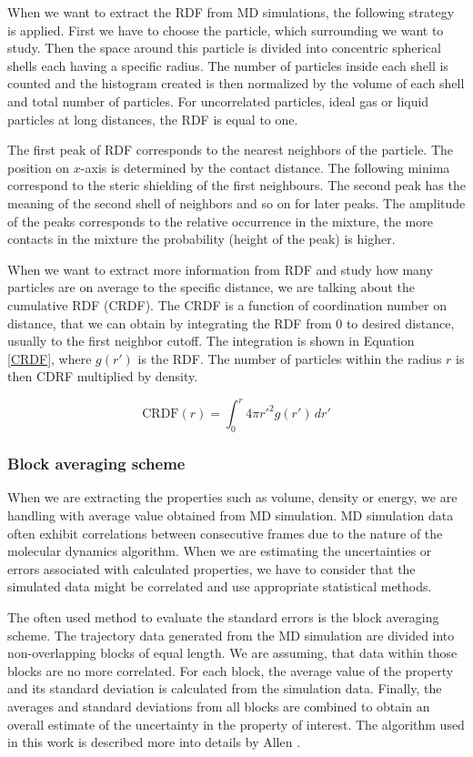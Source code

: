 When we want to extract the RDF from MD simulations, the following strategy is applied. First we have to choose the particle, which surrounding we want to study. Then the space around this particle is divided into concentric spherical shells each having a specific radius. The number of particles inside each shell is counted and the histogram created is then normalized by the volume of each shell and total number of particles. For uncorrelated particles, ideal gas or liquid particles at long distances, the RDF is equal to one. 

The first peak of RDF corresponds to the nearest neighbors of the particle. The position on $x$-axis is determined by the contact distance. The following minima correspond to the steric shielding of the first neighbours. The second peak has the meaning of the second shell of neighbors and so on for later peaks. The amplitude of the peaks corresponds to the relative occurrence in the mixture, the more contacts in the mixture the probability (height of the peak) is higher. \cite{mdskripta}

When we want to extract more information from RDF and study how many particles are on average to the specific distance, we are talking about the cumulative RDF (CRDF). The CRDF is a function of coordination number on distance, that we can obtain by integrating the RDF from 0 to desired distance, usually to the first neighbor cutoff. The integration is shown in Equation \ref{CRDF}, where $g(r')$ is the RDF. The number of particles within the radius $r$ is then CDRF multiplied by density. \cite{mdskripta}

\begin{equation}\label{eq:CRDF}
	\text{CRDF}(r) = \int_{0}^{r} 4\pi r'^2 g(r') \, dr'
\end{equation}

\subsubsection{Block averaging scheme}
When we are extracting the properties such as volume, density or energy, we are handling with average value obtained from MD simulation. MD simulation data often exhibit correlations between consecutive frames due to the nature of the molecular dynamics algorithm. When we are estimating the uncertainties or errors associated with calculated properties, we have to consider that the simulated data might be correlated and use appropriate statistical methods. 

The often used method to evaluate the standard errors is the block averaging scheme. The trajectory data generated from the MD simulation are divided into non-overlapping blocks of equal length. We are assuming, that data within those blocks are no more correlated. For each block, the average value of the property and its standard deviation is calculated from the simulation data. Finally, the averages and standard deviations from all blocks are combined to obtain an overall estimate of the uncertainty in the property of interest. The algorithm used in this work is described more into details by Allen \cite{allen_computer_2017}.


